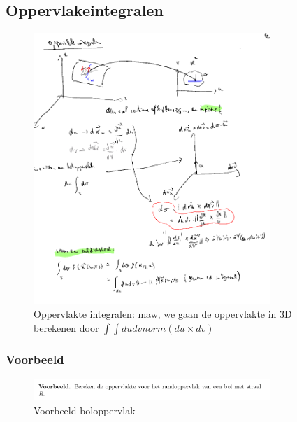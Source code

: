 \documentclass[a4paper]{report}
\begin{document}
\subsection{Oppervlakeintegralen}


\begin{figure}[H]
	\centering
	\includegraphics[width=0.8\textwidth]{assets/oppervlakte_integraal_uitleg.png}
	\caption{Oppervlakte integralen: maw, we gaan de oppervlakte in 3D berekenen door $\int \int du dv norm(du \times dv)$}
	\label{fig:oppervlakte_integraal_uitleg}
\end{figure}

\subsubsection{Voorbeeld}

\begin{figure}[H]
	\centering
	\includegraphics[width=0.8\textwidth]{assets/voorbeeld_boloppervlak.png}
	\caption{Voorbeeld boloppervlak}
	\label{fig:voorbeeld_boloppervlak}
\end{figure}
\end{document}

